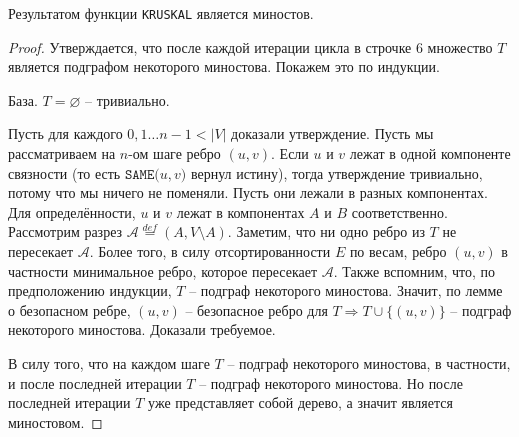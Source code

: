 \St Результатом функции \texttt{KRUSKAL} является миностов.
\begin{proof}
    
    Утверждается, что после каждой итерации цикла в строчке 6 множество $T$ является подграфом некоторого миностова. 
    Покажем это по индукции.

    База. $T = \varnothing$ -- тривиально.

    Пусть для каждого $0, 1 \dots n - 1 < |V|$ доказали утверждение. 
    Пусть мы рассматриваем на $n$-ом шаге ребро $(u, v)$.
    Если $u$ и $v$ лежат в одной компоненте связности (то есть $\texttt{SAME(}u, v\texttt{)}$ вернул истину), тогда утверждение тривиально, потому что мы ничего не поменяли.
    Пусть они лежали в разных компонентах. Для определённости, $u$ и $v$ лежат в компонентах $A$ и $B$ соответственно.
    Рассмотрим разрез $\mathcal{A} \overset{def}{=} (A, V \setminus A)$. 
    Заметим, что ни одно ребро из $T$ не пересекает $\mathcal{A}$.
    Более того, в силу отсортированности $E$ по весам, ребро $(u, v)$ в частности минимальное ребро, которое пересекает $\mathcal{A}$.
    Также вспомним, что, по предположению индукции, $T$ -- подграф некоторого миностова.
    Значит, по лемме о безопасном ребре, $(u, v)$ -- безопасное ребро для $T \Rightarrow T \cup \{(u, v)\}$ -- подграф некоторого миностова. Доказали требуемое.

    В силу того, что на каждом шаге $T$ -- подграф некоторого миностова, в частности, и после последней итерации $T$ -- подграф некоторого миностова. 
    Но после последней итерации $T$ уже представляет собой дерево, а значит является миностовом.

\end{proof}

